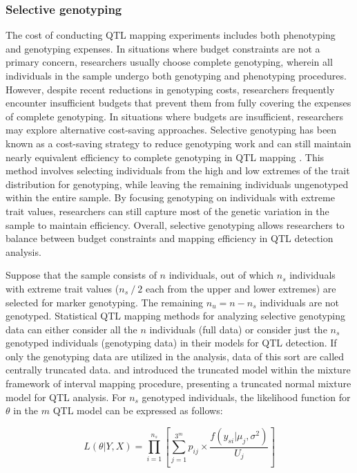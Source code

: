 \subsubsection{Selective genotyping}

The cost of conducting QTL mapping experiments includes both phenotyping and genotyping expenses. In situations where budget constraints are not a primary concern, researchers usually choose complete genotyping, wherein all individuals in the sample undergo both genotyping and phenotyping procedures. However, despite recent reductions in genotyping costs, researchers frequently encounter insufficient budgets that prevent them from fully covering the expenses of complete genotyping. In situations where budgets are insufficient, researchers may explore alternative cost-saving approaches. Selective genotyping has been known as a cost-saving strategy to reduce genotyping work and can still maintain nearly equivalent efficiency to complete genotyping in QTL mapping \citep{Lebowitz-1987, Lander-1989, Xu-2000, Lee-2014}. This method involves selecting individuals from the high and low extremes of the trait distribution for genotyping, while leaving the remaining individuals ungenotyped within the entire sample. By focusing genotyping on individuals with extreme trait values, researchers can still capture most of the genetic variation in the sample to maintain efficiency. Overall, selective genotyping allows researchers to balance between budget constraints and mapping efficiency in QTL detection analysis.

Suppose that the sample consists of $n$ individuals, out of which $n_{s}$ individuals with extreme trait values ($n_{s}⁄2$ each from the upper and lower extremes) are selected for marker genotyping. The remaining $n_{u}=n-n_{s}$ individuals are not genotyped. Statistical QTL mapping methods for analyzing selective genotyping data can either consider all the $n$ individuals (full data) or consider just the $n_{s}$ genotyped individuals (genotyping data) in their models for QTL detection. If only the genotyping data are utilized in the analysis, data of this sort are called centrally truncated data. \citet{Xu-2000} and \citet{Lee-2014} introduced the truncated model within the mixture framework of interval mapping procedure, presenting a truncated normal mixture model for QTL analysis. For $n_{s}$ genotyped individuals, the likelihood function for $\theta$ in the $m$ QTL model can be expressed as follows: 

\begin{equation} 
	L\left(\theta|Y,X\right)=\prod_{i=1}^{n_{s}}\left[\sum_{j=1}^{3^{m}}p_{ij}\times\frac{f\left(y_{si}|\mu_{j},\sigma^{2}\right)}{U_{j}}\right]  \label{eq:e7}
\end{equation} 

